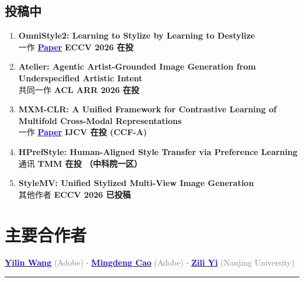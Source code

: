 \documentclass{resume}
\newcommand{\statusbadge}[2]{%
  \begingroup
  \setlength{\fboxsep}{1pt}%
  \colorbox{#1!10}{\textcolor{#1}{\footnotesize\textsf{#2}}}%
  \endgroup
}
\newcommand{\FirstAuthor}{\statusbadge{authorblue}{一作}}
\newcommand{\CoFirstAuthor}{\statusbadge{cofirstteal}{共同一作}}
\newcommand{\CorrespondingAuthor}{\statusbadge{corpurple}{通讯}}
\newcommand{\OtherAuthor}{\statusbadge{authorgray}{其他作者}}
\begin{document}
\vspace{-5pt}

\subsection*{{\textbf{投稿中}}}
\begin{enumerate}
  \item \textbf{OmniStyle2: Learning to Stylize by Learning to Destylize}\\
  \FirstAuthor \quad \href{https://arxiv.org/pdf/2509.05970}{\textcolor{blue}{\textbf{Paper}}} \quad \textbf{ECCV 2026 在投}

  \item \textbf{Atelier: Agentic Artist-Grounded Image Generation from Underspecified Artistic Intent}\\
  \CoFirstAuthor \quad \textbf{ACL ARR 2026 在投}

  \item \textbf{MXM-CLR: A Unified Framework for Contrastive Learning of Multifold Cross-Modal Representations}\\
  \FirstAuthor \quad \href{https://arxiv.org/abs/2303.10839}{\textcolor{blue}{\textbf{Paper}}} \quad \textbf{IJCV 在投 (CCF-A)}

  \item \textbf{HPrefStyle: Human-Aligned Style Transfer via Preference Learning}\\
  \CorrespondingAuthor \quad \textbf{TMM 在投 （中科院一区）}

  \item \textbf{StyleMV: Unified Stylized Multi-View Image Generation}\\
  \OtherAuthor \quad \textbf{ECCV 2026 已投稿}
\end{enumerate}

\vspace{2pt}

\section{\textbf{主要合作者}}

\begin{center}
  \href{https://yilinwang.org/}{\textcolor{blue}{\textbf{Yilin Wang}}} \textcolor{gray}{(Adobe)} \quad $\cdot$ \quad
  \href{https://scholar.google.com/citations?user=EcS0L5sAAAAJ&hl=en}{\textcolor{blue}{\textbf{Mingdeng Cao}}} \textcolor{gray}{(Adobe)} \quad $\cdot$ \quad
  \href{https://scholar.google.com/citations?user=XC6Z56AAAAAJ&hl=en}{\textcolor{blue}{\textbf{Zili Yi}}} \textcolor{gray}{(Nanjing University)}
\end{center}
\vspace{-5pt}
\noindent\rule{\linewidth}{0.4pt}
\end{document}
